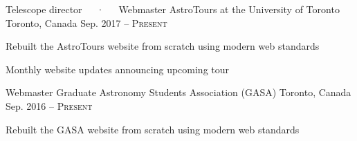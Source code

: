 

\begin{cventries}

  \cventry
    {Telescope director~~~·~~~Webmaster}
    {AstroTours at the University of Toronto}
    {Toronto, Canada}
    {Sep. 2017 -- \textsc{Present}}
    {
      \begin{cvitems}
        \item {Rebuilt the AstroTours website from scratch using modern web standards}
        \item {Monthly website updates announcing upcoming tour}
      \end{cvitems}
    }

  \cventry
    {Webmaster}
    {Graduate Astronomy Students Association (GASA)}
    {Toronto, Canada}
    {Sep. 2016 -- \textsc{Present}}
    {
      \begin{cvitems}
        \item {Rebuilt the GASA website from scratch using modern web standards}
      \end{cvitems}
    }
    
\end{cventries}
